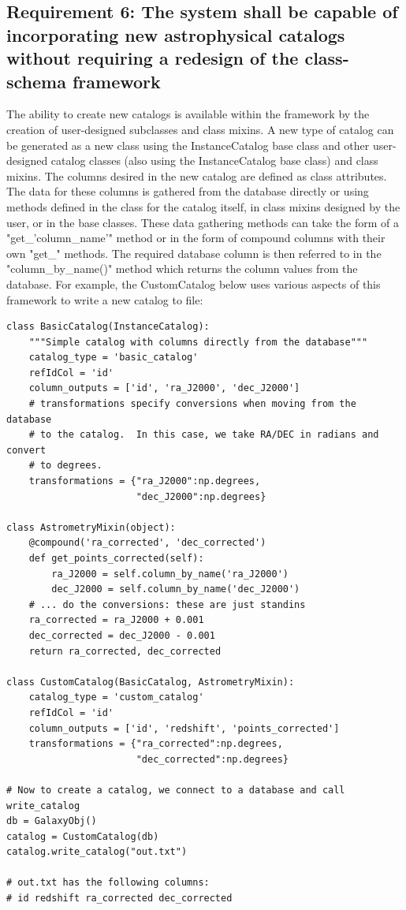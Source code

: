 \documentclass[]{article}
\begin{document}
\subsection{Requirement 6: The system shall be capable of incorporating new astrophysical catalogs without requiring
a redesign of the class-schema framework}
The ability to create new catalogs is available within the framework by the creation of user-designed subclasses and class mixins. A new type of catalog can be generated as a new class using the InstanceCatalog base class and other user-designed catalog classes (also using the InstanceCatalog base class) and class mixins. The columns desired in the new catalog are defined as class attributes. The data for these columns is gathered from the database directly or using methods defined in the class
for the catalog itself, in class mixins designed by the user, or in the base classes. These data gathering methods can take the form of a "get\_'column\_name'" method or in the form of compound columns with their own "get\_" methods. The required database column is then referred to in the "column\_by\_name()" method which returns the column values from the database. For example, the CustomCatalog below uses various aspects of this framework to write a new catalog to file:

\begin{verbatim}
class BasicCatalog(InstanceCatalog):
    """Simple catalog with columns directly from the database"""
    catalog_type = 'basic_catalog'
    refIdCol = 'id'
    column_outputs = ['id', 'ra_J2000', 'dec_J2000']
    # transformations specify conversions when moving from the database
    # to the catalog.  In this case, we take RA/DEC in radians and convert
    # to degrees.
    transformations = {"ra_J2000":np.degrees,
                       "dec_J2000":np.degrees}

class AstrometryMixin(object):
    @compound('ra_corrected', 'dec_corrected')
    def get_points_corrected(self):
        ra_J2000 = self.column_by_name('ra_J2000')
        dec_J2000 = self.column_by_name('dec_J2000')
    # ... do the conversions: these are just standins
    ra_corrected = ra_J2000 + 0.001
    dec_corrected = dec_J2000 - 0.001
    return ra_corrected, dec_corrected

class CustomCatalog(BasicCatalog, AstrometryMixin):
    catalog_type = 'custom_catalog'
    refIdCol = 'id'
    column_outputs = ['id', 'redshift', 'points_corrected']
    transformations = {"ra_corrected":np.degrees,
                       "dec_corrected":np.degrees}

# Now to create a catalog, we connect to a database and call write_catalog
db = GalaxyObj()
catalog = CustomCatalog(db)
catalog.write_catalog("out.txt")

# out.txt has the following columns:
# id redshift ra_corrected dec_corrected
\end{verbatim}
\end{document}
